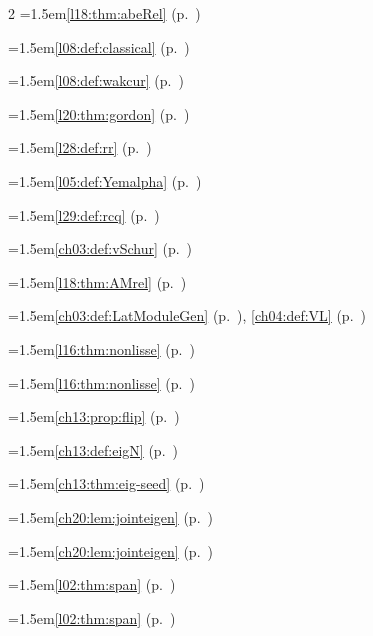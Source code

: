 \begin{multicols}{2}
\hangindent=1.5em\quad \ref{l18:thm:abeRel} (p.~\pageref{l18:thm:abeRel})\par
\hangindent=1.5em\quad \ref{l08:def:classical} (p.~\pageref{l08:def:classical})\par
\hangindent=1.5em\quad \ref{l08:def:wakcur} (p.~\pageref{l08:def:wakcur})\par
\hangindent=1.5em\quad \ref{l20:thm:gordon} (p.~\pageref{l20:thm:gordon})\par
\hangindent=1.5em\quad \ref{l28:def:rr} (p.~\pageref{l28:def:rr})\par
\hangindent=1.5em\quad \ref{l05:def:Yemalpha} (p.~\pageref{l05:def:Yemalpha})\par
\hangindent=1.5em\quad \ref{l29:def:rcq} (p.~\pageref{l29:def:rcq})\par
\hangindent=1.5em\quad \ref{ch03:def:vSchur} (p.~\pageref{ch03:def:vSchur})\par
\hangindent=1.5em\quad \ref{l18:thm:AMrel} (p.~\pageref{l18:thm:AMrel})\par
\hangindent=1.5em\quad \ref{ch03:def:LatModuleGen} (p.~\pageref{ch03:def:LatModuleGen}), \ref{ch04:def:VL} (p.~\pageref{ch04:def:VL})\par
\hangindent=1.5em\quad \ref{l16:thm:nonlisse} (p.~\pageref{l16:thm:nonlisse})\par
\hangindent=1.5em\quad \ref{l16:thm:nonlisse} (p.~\pageref{l16:thm:nonlisse})\par
\hangindent=1.5em\quad \ref{ch13:prop:flip} (p.~\pageref{ch13:prop:flip})\par
\hangindent=1.5em\quad \ref{ch13:def:eigN} (p.~\pageref{ch13:def:eigN})\par
\hangindent=1.5em\quad \ref{ch13:thm:eig-seed} (p.~\pageref{ch13:thm:eig-seed})\par
\hangindent=1.5em\quad \ref{ch20:lem:jointeigen} (p.~\pageref{ch20:lem:jointeigen})\par
\hangindent=1.5em\quad \ref{ch20:lem:jointeigen} (p.~\pageref{ch20:lem:jointeigen})\par
\hangindent=1.5em\quad \ref{l02:thm:span} (p.~\pageref{l02:thm:span})\par
\hangindent=1.5em\quad \ref{l02:thm:span} (p.~\pageref{l02:thm:span})\par

\end{multicols}
